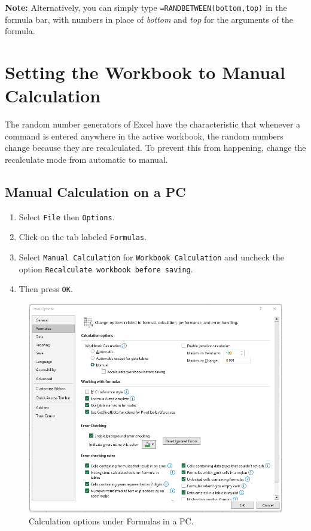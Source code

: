 \documentclass[
]{book}
\providecommand{\tightlist}{%
  \setlength{\itemsep}{0pt}\setlength{\parskip}{0pt}}
\begin{document}
\textbf{Note:} Alternatively, you can simply type \texttt{=RANDBETWEEN(bottom,top)} in the formula bar, with numbers in place of \emph{bottom} and \emph{top} for the arguments of the formula.

\hypertarget{setting-the-workbook-to-manual-calculation}{%
\section{Setting the Workbook to Manual Calculation}\label{setting-the-workbook-to-manual-calculation}}

The random number generators of Excel have the characteristic that whenever a command is entered anywhere in the active workbook, the random numbers change because they are recalculated. To prevent this from happening, change the recalculate mode from automatic to manual.

\hypertarget{manual-calculation-on-a-pc}{%
\subsection{Manual Calculation on a PC}\label{manual-calculation-on-a-pc}}

\begin{enumerate}
\def\labelenumi{\arabic{enumi}.}
\tightlist
\item
  Select \texttt{File} then \texttt{Options}.
\item
  Click on the tab labeled \texttt{Formulas}.
\item
  Select \texttt{Manual\ Calculation} for \texttt{Workbook\ Calculation} and uncheck the option \texttt{Recalculate\ workbook\ before\ saving}.
\item
  Then press \texttt{OK}.
\end{enumerate}

\begin{figure}

{\centering \includegraphics[width=0.8\linewidth]{manualcalc-pc} 

}

\caption{Calculation options under Formulas in a PC.}\label{fig:manualcalc-pc}
\end{figure}
\end{document}
